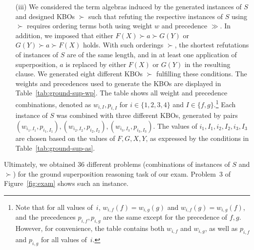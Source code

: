 \begin{itemize}
\item[(iii)] We considered the term algebras induced by the generated
instances of $S$ and designed KBOs $\succ$ such that
refuting the respective instances of $S$ using $\succ$ requires
ordering terms both using weight $w$ and precedence $\gg$. %
In addition, we imposed that  either $F(X) \succ a \succ G(Y)$ 
or $G(Y) \succ a \succ F(X)$ holds. With such orderings $\succ$,
the shortest refutations of instances of $S$ are of the same length, and in
at least one application of superposition, $a$ is replaced by either $F(X)$ or $G(Y)$
in the resulting clause. %
We generated eight different KBOs $\succ$ fulfilling these conditions.
The weights and precedences used to generate the KBOs
are displayed in Table~\ref{tab:ground-sup-wp}.
The table shows all weight and precedence combinations,
denoted as $w_{i, I}, p_{i, I}$ for $i \in \{1, 2, 3, 4\}$
and $I \in \{f, g\}$.\footnote{Note that for all values of~$i$,
$w_{i, f}(f) = w_{i, g}(g)$ and $w_{i, f}(g) = w_{i, g}(f)$,
and the precedences $p_{i, f}, p_{i, g}$ are the same except for
the precedence of $f, g$. However,
for convenience, the table contains both $w_{i, f}$
and $w_{i, g}$, as well as $p_{i, f}$ and $p_{i, g}$ for all values of~$i$.}
Each instance of $S$ was combined with three different KBOs, generated
by pairs
$(w_{i_1, I_1}, p_{i_1, I_1}), (w_{i_2, I_2}, p_{i_2, I_2}), (w_{i_3, I_3}, p_{i_3, I_3})$.
The values of $i_1, I_1, i_2, I_2, i_3, I_3$ are chosen
based on the values of $F, G, X, Y$, as expressed by the
conditions in Table~\ref{tab:ground-sup-as}.
\smallskip
\end{itemize}

  Ultimately, we obtained 36 different problems (combinations of
instances of $S$ and $\succ$) for  the ground
superposition reasoning task of our exam.  Problem~3 of
Figure~\ref{fig:exam} shows such an instance.
